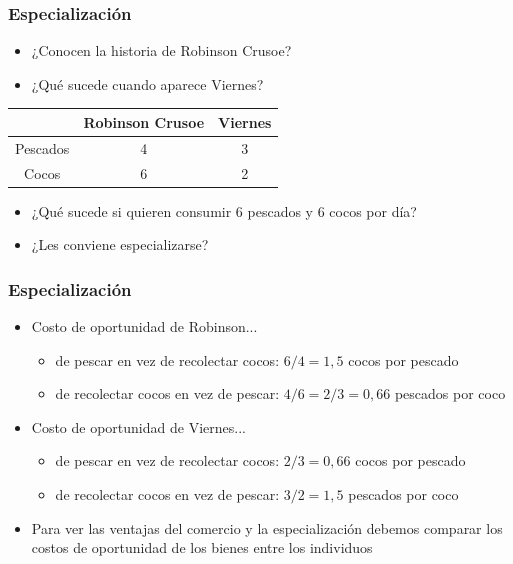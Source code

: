 \documentclass{beamer}
\begin{document}
\begin{frame}
\frametitle{Especialización}
    \begin{itemize}
    \item ¿Conocen la historia de Robinson Crusoe?
    \item ¿Qué sucede cuando aparece Viernes?  
    \end{itemize}
    \centering \vspace{3mm}
    \begin{tabular}{|c|c|c|} \hline
        & Robinson Crusoe & Viernes \\ \hline
     Pescados   & 4 & 3 \\ \hline
     Cocos   & 6 & 2 \\ \hline     \end{tabular}
    \begin{itemize}
    \item ¿Qué sucede si quieren consumir 6 pescados y 6 cocos por día? 
    \item ¿Les conviene especializarse?  
    \end{itemize}
\end{frame}

\begin{frame}
\frametitle{Especialización}
\begin{itemize}
    \item Costo de oportunidad de Robinson...
        \begin{itemize}
        \item de pescar en vez de recolectar cocos: $ 6/4 = 1,5 $ cocos por pescado 
        \item de recolectar cocos en vez de pescar: $ 4/6 = 2/3=0,66 $ pescados por coco
        \end{itemize}
    \item Costo de oportunidad de Viernes...
        \begin{itemize}
        \item de pescar en vez de recolectar cocos: $ 2/3 = 0,66 $ cocos por pescado
        \item de recolectar cocos en vez de pescar: $ 3/2 = 1,5 $ pescados por coco
        \end{itemize}
    \item Para ver las ventajas del comercio y la especialización debemos comparar los costos de oportunidad de los bienes entre los individuos
\end{itemize}
\end{frame}
\end{document}
